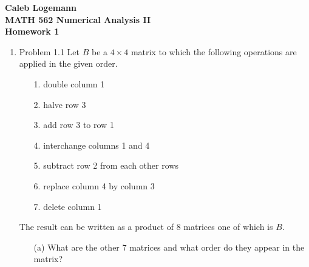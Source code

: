 \documentclass[11pt]{article}
\begin{document}
\noindent \textbf{\Large{Caleb Logemann \\
MATH 562 Numerical Analysis II \\
Homework 1
}}

%
\begin{enumerate}
    \item %
        Problem 1.1
        Let $B$ be a $4 \times 4$ matrix to which the following operations are
        applied in the given order.
        \begin{enumerate}
            \item[1.] double column 1
            \item[2.] halve row 3
            \item[3.] add row 3 to row 1
            \item[4.] interchange columns 1 and 4
            \item[5.] subtract row 2 from each other rows
            \item[6.] replace column 4 by column 3
            \item[7.] delete column 1
        \end{enumerate}
        The result can be written as a product of 8 matrices one of which is $B$.
        \begin{enumerate}
            \item[(a)]
                What are the other 7 matrices and what order do they appear in
                the matrix?


\end{enumerate}
\end{enumerate}
\end{document}
